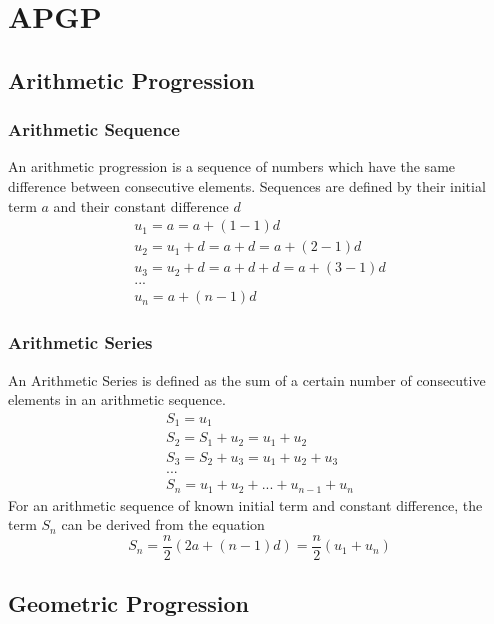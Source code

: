 \documentclass[../main]{subfiles}
\begin{document}
\section{APGP}

\subsection{Arithmetic Progression}

	\subsubsection{Arithmetic Sequence}
	An arithmetic progression is a sequence of numbers which have the same difference between consecutive elements. Sequences are defined by their initial term \(a\) and their constant difference \(d\)
	\begin{equation*} \begin{gathered}
		u_1 = a = a + (1-1) d\\
		u_2 = u_1 + d = a + d = a + (2-1) d \\
		u_3 = u_2 + d = a + d + d = a + (3-1) d\\
		...\\
		u_n = a + (n-1) d 
	\end{gathered} \end{equation*} 
	\subsubsection{Arithmetic Series}
	An Arithmetic Series is defined as the sum of a certain number of consecutive elements in an arithmetic sequence.
	\begin{equation*} \begin{gathered}
		S_1 = u_1 \\
		S_2 = S_1 + u_2 = u_1 + u_2 \\
		S_3 = S_2 + u_3 = u_1 + u_2 + u_3 \\
		... \\
		S_n = u_1 + u_2 + ... + u_{n-1} + u_n
	\end{gathered} \end{equation*} 
	For an arithmetic sequence of known initial term and constant difference, the term \(S_n\) can be derived from the equation
	\[ S_n = \frac{n}{2}(2a + (n-1)d) = \frac{n}{2}(u_1 + u_n) \]

\subsection{Geometric Progression}
	
\end{document}
